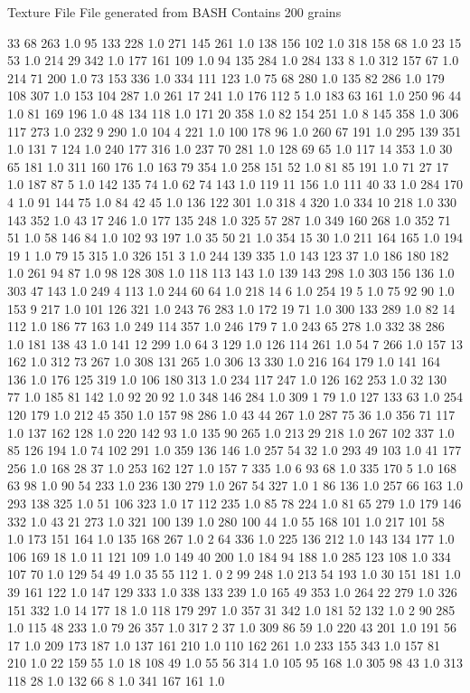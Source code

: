 Texture File
File generated from BASH
Contains 200 grains

33 68 263 1.0
95 133 228 1.0
271 145 261 1.0
138 156 102 1.0
318 158 68 1.0
23 15 53 1.0
214 29 342 1.0
177 161 109 1.0
94 135 284 1.0
284 133 8 1.0
312 157 67 1.0
214 71 200 1.0
73 153 336 1.0
334 111 123 1.0
75 68 280 1.0
135 82 286 1.0
179 108 307 1.0
153 104 287 1.0
261 17 241 1.0
176 112 5 1.0
183 63 161 1.0
250 96 44 1.0
81 169 196 1.0
48 134 118 1.0
171 20 358 1.0
82 154 251 1.0
8 145 358 1.0
306 117 273 1.0
232 9 290 1.0
104 4 221 1.0
100 178 96 1.0
260 67 191 1.0
295 139 351 1.0
131 7 124 1.0
240 177 316 1.0
237 70 281 1.0
128 69 65 1.0
117 14 353 1.0
30 65 181 1.0
311 160 176 1.0
163 79 354 1.0
258 151 52 1.0
81 85 191 1.0
71 27 17 1.0
187 87 5 1.0
142 135 74 1.0
62 74 143 1.0
119 11 156 1.0
111 40 33 1.0
284 170 4 1.0
91 144 75 1.0
84 42 45 1.0
136 122 301 1.0
318 4 320 1.0
334 10 218 1.0
330 143 352 1.0
43 17 246 1.0
177 135 248 1.0
325 57 287 1.0
349 160 268 1.0
352 71 51 1.0
58 146 84 1.0
102 93 197 1.0
35 50 21 1.0
354 15 30 1.0
211 164 165 1.0
194 19 1 1.0
79 15 315 1.0
326 151 3 1.0
244 139 335 1.0
143 123 37 1.0
186 180 182 1.0
261 94 87 1.0
98 128 308 1.0
118 113 143 1.0
139 143 298 1.0
303 156 136 1.0
303 47 143 1.0
249 4 113 1.0
244 60 64 1.0
218 14 6 1.0
254 19 5 1.0
75 92 90 1.0
153 9 217 1.0
101 126 321 1.0
243 76 283 1.0
172 19 71 1.0
300 133 289 1.0
82 14 112 1.0
186 77 163 1.0
249 114 357 1.0
246 179 7 1.0
243 65 278 1.0
332 38 286 1.0
181 138 43 1.0
141 12 299 1.0
64 3 129 1.0
126 114 261 1.0
54 7 266 1.0
157 13 162 1.0
312 73 267 1.0
308 131 265 1.0
306 13 330 1.0
216 164 179 1.0
141 164 136 1.0
176 125 319 1.0
106 180 313 1.0
234 117 247 1.0
126 162 253 1.0
32 130 77 1.0
185 81 142 1.0
92 20 92 1.0
348 146 284 1.0
309 1 79 1.0
127 133 63 1.0
254 120 179 1.0
212 45 350 1.0
157 98 286 1.0
43 44 267 1.0
287 75 36 1.0
356 71 117 1.0
137 162 128 1.0
220 142 93 1.0
135 90 265 1.0
213 29 218 1.0
267 102 337 1.0
85 126 194 1.0
74 102 291 1.0
359 136 146 1.0
257 54 32 1.0
293 49 103 1.0
41 177 256 1.0
168 28 37 1.0
253 162 127 1.0
157 7 335 1.0
6 93 68 1.0
335 170 5 1.0
168 63 98 1.0
90 54 233 1.0
236 130 279 1.0
267 54 327 1.0
1 86 136 1.0
257 66 163 1.0
293 138 325 1.0
51 106 323 1.0
17 112 235 1.0
85 78 224 1.0
81 65 279 1.0
179 146 332 1.0
43 21 273 1.0
321 100 139 1.0
280 100 44 1.0
55 168 101 1.0
217 101 58 1.0
173 151 164 1.0
135 168 267 1.0
2 64 336 1.0
225 136 212 1.0
143 134 177 1.0
106 169 18 1.0
11 121 109 1.0
149 40 200 1.0
184 94 188 1.0
285 123 108 1.0
334 107 70 1.0
129 54 49 1.0
35 55 112 1. 0
2 99 248 1.0
213 54 193 1.0
30 151 181 1.0
39 161 122 1.0
147 129 333 1.0
338 133 239 1.0
165 49 353 1.0
264 22 279 1.0
326 151 332 1.0
14 177 18 1.0
118 179 297 1.0
357 31 342 1.0
181 52 132 1.0
2 90 285 1.0
115 48 233 1.0
79 26 357 1.0
317 2 37 1.0
309 86 59 1.0
220 43 201 1.0
191 56 17 1.0
209 173 187 1.0
137 161 210 1.0
110 162 261 1.0
233 155 343 1.0
157 81 210 1.0
22 159 55 1.0
18 108 49 1.0
55 56 314 1.0
105 95 168 1.0
305 98 43 1.0
313 118 28 1.0
132 66 8 1.0
341 167 161 1.0
